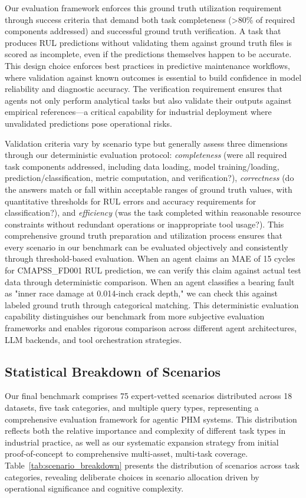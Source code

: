 \documentclass[sigconf,review]{acmart}
\begin{document}
Our evaluation framework enforces this ground truth utilization requirement through success criteria that demand both task completeness (\textgreater80\% of required components addressed) and successful ground truth verification. A task that produces RUL predictions without validating them against ground truth files is scored as incomplete, even if the predictions themselves happen to be accurate. This design choice enforces best practices in predictive maintenance workflows, where validation against known outcomes is essential to build confidence in model reliability and diagnostic accuracy. The verification requirement ensures that agents not only perform analytical tasks but also validate their outputs against empirical references---a critical capability for industrial deployment where unvalidated predictions pose operational risks.

Validation criteria vary by scenario type but generally assess three dimensions through our deterministic evaluation protocol: \textit{completeness} (were all required task components addressed, including data loading, model training/loading, prediction/classification, metric computation, and verification?), \textit{correctness} (do the answers match or fall within acceptable ranges of ground truth values, with quantitative thresholds for RUL errors and accuracy requirements for classification?), and \textit{efficiency} (was the task completed within reasonable resource constraints without redundant operations or inappropriate tool usage?). This comprehensive ground truth preparation and utilization process ensures that every scenario in our benchmark can be evaluated objectively and consistently through threshold-based evaluation. When an agent claims an MAE of 15 cycles for CMAPSS\_FD001 RUL prediction, we can verify this claim against actual test data through deterministic comparison. When an agent classifies a bearing fault as "inner race damage at 0.014-inch crack depth," we can check this against labeled ground truth through categorical matching. This deterministic evaluation capability distinguishes our benchmark from more subjective evaluation frameworks and enables rigorous comparison across different agent architectures, LLM backends, and tool orchestration strategies.

\subsection{Statistical Breakdown of Scenarios}

Our final benchmark comprises 75 expert-vetted scenarios distributed across 18 datasets, five task categories, and multiple query types, representing a comprehensive evaluation framework for agentic PHM systems. This distribution reflects both the relative importance and complexity of different task types in industrial practice, as well as our systematic expansion strategy from initial proof-of-concept to comprehensive multi-asset, multi-task coverage. Table~\ref{tab:scenario_breakdown} presents the distribution of scenarios across task categories, revealing deliberate choices in scenario allocation driven by operational significance and cognitive complexity.
\end{document}

